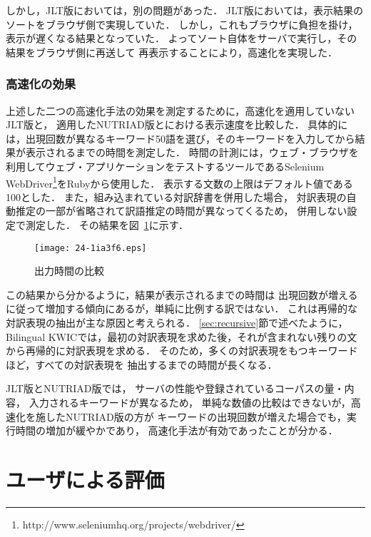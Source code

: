\documentclass[japanese]{jnlp_1.4}
\begin{document}
しかし，JLT版においては，別の問題があった．
JLT版においては，表示結果のソートをブラウザ側で実現していた．
しかし，これもブラウザに負担を掛け，表示が遅くなる結果となっていた．
よってソート自体をサーバで実行し，その結果をブラウザ側に再送して
再表示することにより，高速化を実現した．


\subsubsection{高速化の効果}

上述した二つの高速化手法の効果を測定するために，高速化を適用していないJLT版と，
適用したNUTRIAD版とにおける表示速度を比較した．
具体的には，出現回数が異なるキーワード50語を選び，そのキーワードを入力してから結果が表示されるまでの時間を測定した．
時間の計測には，ウェブ・ブラウザを利用してウェブ・アプリケーションをテストするツールであるSelenium WebDriver{\footnote{http://www.seleniumhq.org/projects/webdriver/}}をRubyから使用した．
表示する文数の上限はデフォルト値である100とした．
また，組み込まれている対訳辞書を併用した場合，
対訳表現の自動推定の一部が省略されて訳語推定の時間が異なってくるため，
併用しない設定で測定した．
その結果を図~{\ref{fig:time}}に示す．

\begin{figure}[t]
\begin{center}
\texttt{[image: 24-1ia3f6.eps]}
\end{center}
\caption{出力時間の比較}
\label{fig:time}
\end{figure}

この結果から分かるように，結果が表示されるまでの時間は
出現回数が増えるに従って増加する傾向にあるが，単純に比例する訳ではない．
これは再帰的な対訳表現の抽出が主な原因と考えられる．
\ref{sec:recursive}節で述べたように，Bilingual KWICでは，最初の対訳表現を求めた後，それが含まれない残りの文から再帰的に対訳表現を求める．
そのため，多くの対訳表現をもつキーワードほど，すべての対訳表現を
抽出するまでの時間が長くなる．

JLT版とNUTRIAD版では，
サーバの性能や登録されているコーパスの量・内容，
入力されるキーワードが異なるため，
単純な数値の比較はできないが，高速化を施したNUTRIAD版の方が
キーワードの出現回数が増えた場合でも，実行時間の増加が緩やかであり，
高速化手法が有効であったことが分かる．


\section{ユーザによる評価}
\label{sec:evaluation}
\end{document}
